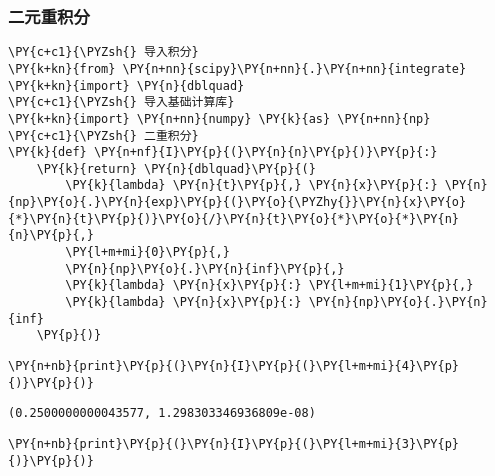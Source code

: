     \hypertarget{ux4e8cux5143ux91cdux79efux5206}{%
\subsubsection{二元重积分}\label{ux4e8cux5143ux91cdux79efux5206}}

    \begin{tcolorbox}[breakable, size=fbox, boxrule=1pt, pad at break*=1mm,colback=cellbackground, colframe=cellborder]
\begin{Verbatim}[commandchars=\\\{\}]
\PY{c+c1}{\PYZsh{} 导入积分}
\PY{k+kn}{from} \PY{n+nn}{scipy}\PY{n+nn}{.}\PY{n+nn}{integrate} \PY{k+kn}{import} \PY{n}{dblquad}
\PY{c+c1}{\PYZsh{} 导入基础计算库}
\PY{k+kn}{import} \PY{n+nn}{numpy} \PY{k}{as} \PY{n+nn}{np}
\PY{c+c1}{\PYZsh{} 二重积分}
\PY{k}{def} \PY{n+nf}{I}\PY{p}{(}\PY{n}{n}\PY{p}{)}\PY{p}{:}
    \PY{k}{return} \PY{n}{dblquad}\PY{p}{(}
        \PY{k}{lambda} \PY{n}{t}\PY{p}{,} \PY{n}{x}\PY{p}{:} \PY{n}{np}\PY{o}{.}\PY{n}{exp}\PY{p}{(}\PY{o}{\PYZhy{}}\PY{n}{x}\PY{o}{*}\PY{n}{t}\PY{p}{)}\PY{o}{/}\PY{n}{t}\PY{o}{*}\PY{o}{*}\PY{n}{n}\PY{p}{,} 
        \PY{l+m+mi}{0}\PY{p}{,} 
        \PY{n}{np}\PY{o}{.}\PY{n}{inf}\PY{p}{,} 
        \PY{k}{lambda} \PY{n}{x}\PY{p}{:} \PY{l+m+mi}{1}\PY{p}{,} 
        \PY{k}{lambda} \PY{n}{x}\PY{p}{:} \PY{n}{np}\PY{o}{.}\PY{n}{inf}
    \PY{p}{)}
\end{Verbatim}
\end{tcolorbox}

    \begin{tcolorbox}[breakable, size=fbox, boxrule=1pt, pad at break*=1mm,colback=cellbackground, colframe=cellborder]
\begin{Verbatim}[commandchars=\\\{\}]
\PY{n+nb}{print}\PY{p}{(}\PY{n}{I}\PY{p}{(}\PY{l+m+mi}{4}\PY{p}{)}\PY{p}{)}
\end{Verbatim}
\end{tcolorbox}

    \begin{Verbatim}[commandchars=\\\{\}]
(0.2500000000043577, 1.298303346936809e-08)
    \end{Verbatim}

    \begin{tcolorbox}[breakable, size=fbox, boxrule=1pt, pad at break*=1mm,colback=cellbackground, colframe=cellborder]
\begin{Verbatim}[commandchars=\\\{\}]
\PY{n+nb}{print}\PY{p}{(}\PY{n}{I}\PY{p}{(}\PY{l+m+mi}{3}\PY{p}{)}\PY{p}{)}
\end{Verbatim}
\end{tcolorbox}

